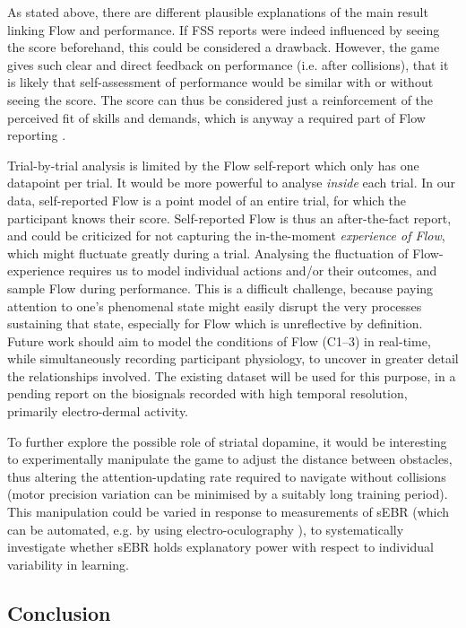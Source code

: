 \documentclass[fleqn,10pt]{wlscirep}
\begin{document}
As stated above, there are different plausible explanations of the main result linking Flow and performance. If FSS reports were indeed influenced by seeing the score beforehand, this could be considered a drawback. However, the game gives such clear and direct feedback on performance (i.e. after collisions), that it is likely that self-assessment of performance would be similar with or without seeing the score. The score can thus be considered just a reinforcement of the perceived fit of skills and demands, which is anyway a required part of Flow reporting \cite{Keller2012}.

Trial-by-trial analysis is limited by the Flow self-report which only has one datapoint per trial. It would be more powerful to analyse {\it inside} each trial. In our data, self-reported Flow is a point model of an entire trial, for which the participant knows their score. Self-reported Flow is thus an after-the-fact report, and could be criticized for not capturing the in-the-moment {\it experience of Flow}, which might fluctuate greatly during a trial. Analysing the fluctuation of Flow-experience requires us to model individual actions and/or their outcomes, and sample Flow during performance. This is a difficult challenge, because paying attention to one's phenomenal state might easily disrupt the very processes sustaining that state, especially for Flow which is unreflective by definition. Future work should aim to model the conditions of Flow ({\sf C1--3}) in real-time, while simultaneously recording participant physiology, to uncover in greater detail the relationships involved. The existing dataset will be used for this purpose, in a pending report on the biosignals recorded with high temporal resolution, primarily electro-dermal activity.

To further explore the possible role of striatal dopamine, it would be interesting to experimentally manipulate the game to adjust the distance between obstacles, thus altering the attention-updating rate required to navigate without collisions (motor precision variation can be minimised by a suitably long training period). This manipulation could be varied in response to measurements of sEBR (which can be automated, e.g. by using electro-oculography \cite{toivanen2014}), to systematically investigate whether sEBR holds explanatory power with respect to individual variability in learning.


\subsection*{Conclusion}
\end{document}
